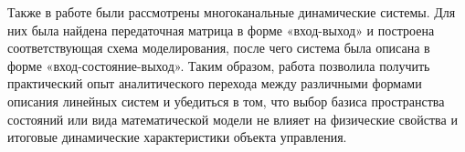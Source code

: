 \documentclass[a4paper, 12pt]{article}
\begin{document}
Также в работе были рассмотрены многоканальные динамические системы. Для них была найдена передаточная матрица в форме «вход-выход» и построена соответствующая схема моделирования, после чего система была описана в форме «вход-состояние-выход». Таким образом, работа позволила получить практический опыт аналитического перехода между различными формами описания линейных систем и убедиться в том, что выбор базиса пространства состояний или вида математической модели не влияет на физические свойства и итоговые динамические характеристики объекта управления.
\end{document}
